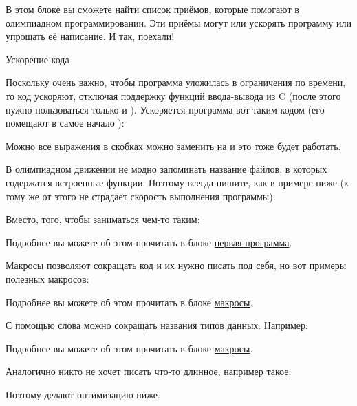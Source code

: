 \hypertarget{1.0}{}
В этом блоке вы сможете найти список приёмов, которые помогают в олимпиадном программировании. Эти приёмы могут или ускорять программу или упрощать её написание. И так, поехали!


\startspace
Ускорение кода
\endspace

Поскольку очень важно, чтобы программа уложилась в ограничения по времени, то код ускоряют, отключая поддержку функций ввода-вывода из C (после этого нужно пользоваться только  и ). Ускоряется программа вот таким кодом (его помещают в самое начало ):


Можно все выражения в скобках можно заменить на  и это тоже будет работать.


\startspace
{}
\endspace

В олимпиадном движении не модно запоминать название файлов, в которых содержатся встроенные функции. Поэтому всегда пишите, как в примере ниже (к тому же от этого не страдает скорость выполнения программы).


Вместо, того, чтобы заниматься чем-то таким:


Подробнее вы можете об этом прочитать в блоке \hyperlink{1.1}{первая программа}.


\startspace
{}
\endspace

Макросы позволяют сокращать код и их нужно писать под себя, но вот примеры полезных макросов:


Подробнее вы можете об этом прочитать в блоке \hyperlink{macros}{макросы}.


\startspace
{}
\endspace

С помощью слова  можно сокращать названия типов данных. Например:


Подробнее вы можете об этом прочитать в блоке \hyperlink{macros}{макросы}.


\startspace
{}
\endspace

Аналогично никто не хочет писать что-то длинное, например такое:


Поэтому делают оптимизацию ниже.


